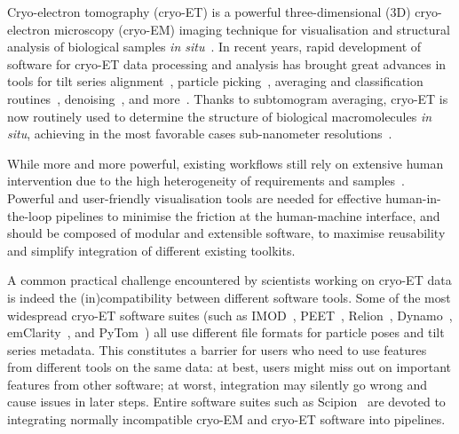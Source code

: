 Cryo-electron tomography (cryo-ET) is a powerful three-dimensional (3D) cryo-electron microscopy (cryo-EM) imaging technique for visualisation and structural analysis of biological samples \emph{in situ}~\cite{turkPromiseChallengesCryoelectron2020}. In recent years, rapid development of software for cryo-ET data processing and analysis has brought great advances in tools for tilt series alignment~\cite{zhengAreTomoIntegratedSoftware2022}, particle picking~\cite{riceTomoTwinGeneralized3D2023,wagnerSPHIREcrYOLOFastAccurate2019}, averaging and classification routines~\cite{zivanovBayesianApproachSingleparticle2022,tegunovRealtimeCryoelectronMicroscopy2019,tegunovMultiparticleCryoEMRefinement2021}, denoising~\cite{beplerTopazDenoiseGeneralDeep2020,buchholzCryoCAREContentAwareImage2018}, and more~\cite{galaz-montoyaSingleParticleTomography2015}. Thanks to subtomogram averaging, cryo-ET is now routinely used to determine the structure of biological macromolecules \emph{in situ}, achieving in the most favorable cases sub-nanometer resolutions~\cite{schurHighresolutionSituStructural2019,turonovaEfficient3DCTFCorrection2017}.

While more and more powerful, existing workflows still rely on extensive human intervention due to the high heterogeneity of requirements and samples~\cite{burtFlexibleFrameworkMultiparticle2021,scaramuzzaStepbystepGuideEfficient2021}. Powerful and user-friendly visualisation tools are needed for effective human-in-the-loop pipelines to minimise the friction at the human-machine interface, and should be composed of modular and extensible software, to maximise reusability and simplify integration of different existing toolkits.

A common practical challenge encountered by scientists working on cryo-ET data is indeed the (in)compatibility between different software tools. Some of the most widespread cryo-ET software suites (such as IMOD~\cite{kremerComputerVisualizationThreeDimensional1996}, PEET~\cite{nicastroMolecularArchitectureAxonemes2006,heumannClusteringVarianceMaps2011}, Relion~\cite{scheresRELIONImplementationBayesian2012}, Dynamo~\cite{castano-diezDynamoFlexibleUserfriendly2012}, emClarity~\cite{himesEmClaritySoftwareHighresolution2018}, and PyTom~\cite{hrabePyTomPythonbasedToolbox2012,chailletExtensiveAngularSampling2023}) all use different file formats for particle poses and tilt series metadata. This constitutes a barrier for users who need to use features from different tools on the same data: at best, users might miss out on important features from other software; at worst, integration may silently go wrong and cause issues in later steps. Entire software suites such as Scipion~\cite{delarosa-trevinScipionSoftwareFramework2016} are devoted to integrating normally incompatible cryo-EM and cryo-ET software into pipelines.

